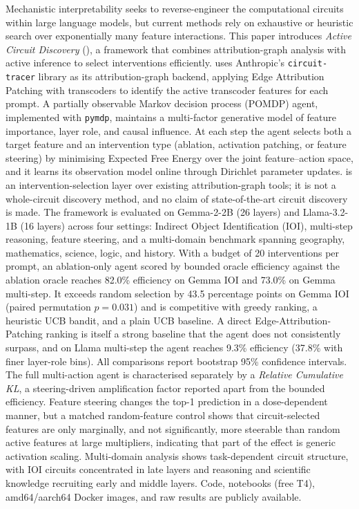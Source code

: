 Mechanistic interpretability seeks to reverse-engineer the computational
circuits within large language models, but current methods rely on exhaustive
or heuristic search over exponentially many feature interactions. This paper
introduces \emph{Active Circuit Discovery} (\ACD{}), a framework that combines
attribution-graph analysis with active inference to select interventions
efficiently. \ACD{} uses Anthropic's \texttt{circuit-tracer} library as its
attribution-graph backend, applying Edge Attribution Patching with transcoders
to identify the active transcoder features for each prompt. A partially
observable Markov decision process (POMDP) agent, implemented with
\texttt{pymdp}, maintains a multi-factor generative model of feature
importance, layer role, and causal influence. At each step the agent selects
both a target feature and an intervention type (ablation, activation patching,
or feature steering) by minimising Expected Free Energy over the joint
feature--action space, and it learns its observation model online through
Dirichlet parameter updates. \ACD{} is an intervention-selection layer over
existing attribution-graph tools; it is not a whole-circuit discovery method,
and no claim of state-of-the-art circuit discovery is made. The framework is
evaluated on Gemma-2-2B (26 layers) and Llama-3.2-1B (16 layers) across four
settings: Indirect Object Identification (IOI), multi-step reasoning, feature
steering, and a multi-domain benchmark spanning geography, mathematics,
science, logic, and history. With a budget of 20 interventions per prompt, an
ablation-only agent scored by bounded oracle efficiency against the ablation
oracle reaches 82.0\% efficiency on Gemma IOI and 73.0\% on Gemma multi-step.
It exceeds random selection by 43.5 percentage points on Gemma IOI (paired
permutation $p=0.031$) and is competitive with greedy ranking, a heuristic UCB
bandit, and a plain UCB baseline. A direct Edge-Attribution-Patching ranking is
itself a strong baseline that the agent does not consistently surpass, and on
Llama multi-step the agent reaches 9.3\% efficiency (37.8\% with finer
layer-role bins). All comparisons report bootstrap 95\% confidence intervals.
The full multi-action agent is characterised separately by a \emph{Relative
Cumulative KL}, a steering-driven amplification factor reported apart from the
bounded efficiency. Feature steering changes the top-1 prediction in a
dose-dependent manner, but a matched random-feature control shows that
circuit-selected features are only marginally, and not significantly, more
steerable than random active features at large multipliers, indicating that
part of the effect is generic activation scaling. Multi-domain analysis shows
task-dependent circuit structure, with IOI circuits concentrated in late layers
and reasoning and scientific knowledge recruiting early and middle layers. Code,
notebooks (free T4), amd64/aarch64 Docker images, and raw results are publicly
available.

